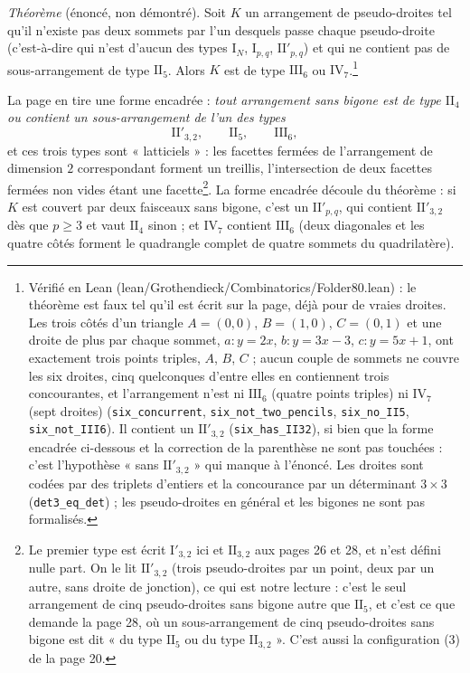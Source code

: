 \documentclass[11pt,a4paper]{article}
\begin{document}
\emph{Théorème} (énoncé, non démontré). Soit $K$ un arrangement de
pseudo-droites tel qu'il n'existe pas deux sommets par l'un desquels passe
chaque pseudo-droite (c'est-à-dire qui n'est d'aucun des types
$\mathrm{I}_N$, $\mathrm{I}_{p,q}$, $\mathrm{II}'_{p,q}$) et qui ne contient
pas de sous-arrangement de type $\mathrm{II}_5$. Alors $K$ est de type
$\mathrm{III}_6$ ou $\mathrm{IV}_7$.\footnote{Vérifié en Lean
(lean/Grothendieck/Combinatorics/Folder80.lean) : le théorème est faux tel qu'il est
écrit sur la page, déjà pour de vraies droites. Les trois côtés d'un
triangle $A = (0,0)$, $B = (1,0)$, $C = (0,1)$ et une droite de plus par
chaque sommet, $a : y = 2x$, $b : y = 3x - 3$, $c : y = 5x + 1$, ont
exactement trois points triples, $A$, $B$, $C$ ; aucun couple de sommets ne
couvre les six droites, cinq quelconques d'entre elles en contiennent trois
concourantes, et l'arrangement n'est ni $\mathrm{III}_6$ (quatre points
triples) ni $\mathrm{IV}_7$ (sept droites) (\texttt{six\_concurrent},
\texttt{six\_not\_two\_pencils}, \texttt{six\_no\_II5},
\texttt{six\_not\_III6}). Il contient un $\mathrm{II}'_{3,2}$
(\texttt{six\_has\_II32}), si bien que la forme encadrée ci-dessous et la
correction de la parenthèse ne sont pas touchées : c'est l'hypothèse
« sans $\mathrm{II}'_{3,2}$ » qui manque à l'énoncé. Les droites sont codées
par des triplets d'entiers et la concourance par un déterminant $3 \times 3$
(\texttt{det3\_eq\_det}) ; les pseudo-droites en général et les bigones ne
sont pas formalisés.}

La page en tire une forme encadrée : \emph{tout arrangement sans bigone est
de type $\mathrm{II}_4$ ou contient un sous-arrangement de l'un des types}
\[
\mathrm{II}'_{3,2}, \qquad \mathrm{II}_5, \qquad \mathrm{III}_6,
\]
et ces trois types sont « latticiels » : les facettes fermées de
l'arrangement de dimension $2$ correspondant forment un treillis,
l'intersection de deux facettes fermées non vides étant une
facette\footnote{Le premier type est écrit $\mathrm{I}'_{3,2}$ ici et
$\mathrm{II}_{3,2}$ aux pages 26 et 28, et n'est défini nulle part. On le lit
$\mathrm{II}'_{3,2}$ (trois pseudo-droites par un point, deux par un
autre, sans droite de jonction), ce qui est notre lecture : c'est le seul
arrangement de cinq pseudo-droites sans bigone autre que $\mathrm{II}_5$, et
c'est ce que demande la page 28, où un sous-arrangement de cinq
pseudo-droites sans bigone est dit « du type $\mathrm{II}_5$ ou du type
$\mathrm{II}_{3,2}$ ». C'est aussi la configuration (3) de la page 20.}. La
forme encadrée découle du théorème : si $K$ est couvert par deux faisceaux
sans bigone, c'est un $\mathrm{II}'_{p,q}$, qui contient
$\mathrm{II}'_{3,2}$ dès que $p \geqslant 3$ et vaut $\mathrm{II}_4$ sinon ; et
$\mathrm{IV}_7$ contient $\mathrm{III}_6$ (deux diagonales et les quatre côtés
forment le quadrangle complet de quatre sommets du quadrilatère).
\end{document}
